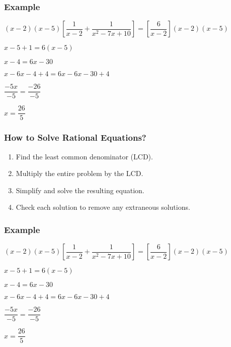 \documentclass[14pt]{beamer}
\begin{document}
    \begin{frame}
    	\frametitle{Example}
    	$ (x - 2 )(x - 5) \left[\dfrac{1}{x - 2} + \dfrac{1}{x^2 - 7x + 10} \right] = \left[\dfrac{6}{x - 2}\right] (x - 2) ( x - 5 ) $
    	
    	\vspace{0.5em} $ x - 5 + 1 = 6 (x - 5) $
    	
    	\vspace{0.5em} $  x - 4 =  6x - 30 $
    	
    	\vspace{0.5em} $  x -6x - 4 + 4 =  6x -6x  - 30 + 4 $
    	
    	\vspace{0.5em} $  \dfrac{-5x}{-5} = \dfrac{ - 26}{-5} $
    	
    	\pause \vspace{0.5em} $ x = \dfrac{ 26}{5} $ 
    \end{frame}

    \begin{frame}
    	\frametitle{How to Solve Rational Equations?}
    	\begin{enumerate}
    		\item Find the least common denominator (LCD).
    		\item Multiply the entire problem by the LCD.
    		\item Simplify and solve the resulting equation.
    		\item Check each solution to remove any extraneous solutions.
    	\end{enumerate}
    \end{frame}

    \begin{frame}
    	\frametitle{Example}
    	$ (x - 2 )(x - 5) \left[\dfrac{1}{x - 2} + \dfrac{1}{x^2 - 7x + 10} \right] = \left[\dfrac{6}{x - 2}\right] (x - 2) ( x - 5 ) $
    	
    	\vspace{0.5em} $ x - 5 + 1 = 6 (x - 5) $
    	
    	\vspace{0.5em} $  x - 4 =  6x - 30 $
    	
    	\vspace{0.5em} $  x -6x - 4 + 4 =  6x -6x  - 30 + 4 $
    	
    	\vspace{0.5em} $  \dfrac{-5x}{-5} = \dfrac{ - 26}{-5} $
    	
    	\vspace{0.5em} $ x = \dfrac{ 26}{5} $ \pause \redcheck
    \end{frame}
\end{document}
